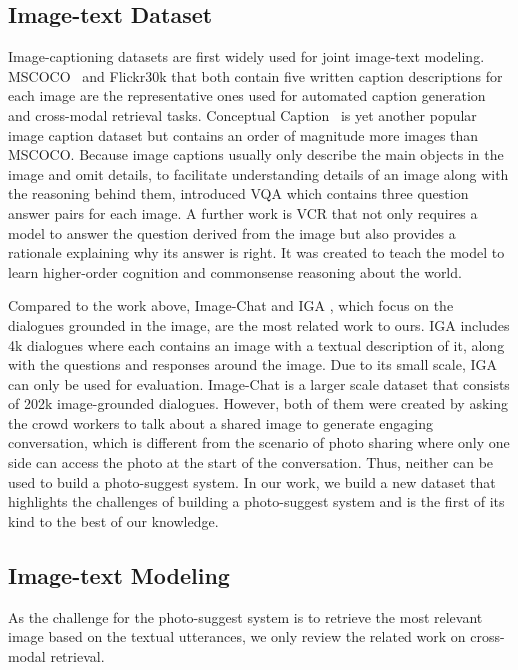 \documentclass[11pt,a4paper]{article}
\begin{document}
\subsection{Image-text Dataset}
Image-captioning datasets are first widely used for joint image-text modeling. 
MSCOCO~\cite{miscoco_lin_2014} and Flickr30k \cite{young-etal-2014-image} that both contain five written caption descriptions for each image are the representative ones used for automated caption generation and cross-modal retrieval tasks. Conceptual Caption~\cite{sharma2018conceptual} is yet another popular image caption dataset but contains an order of magnitude more images than MSCOCO. Because image captions usually only describe the main objects in the image and omit details, to facilitate understanding details of an image along with the reasoning behind them, \citet{vqa} introduced VQA which contains three question answer pairs for each image. A further work is VCR \citep{zellers2019vcr} that not only requires a model to answer the question derived from the image but also provides a rationale explaining why its answer is right. It was created to teach the model to learn higher-order cognition and commonsense reasoning about the world.

Compared to the work above, Image-Chat \cite{shuster-etal-2020-image} and IGA \cite{mostafazadeh2017imagegrounded}, which focus on the dialogues grounded in the image, are the most related work to ours. IGA includes 4k dialogues where each contains an image with a textual description of it, along with the questions and responses around the image. Due to its small scale, IGA can only be used for evaluation. Image-Chat is a larger scale dataset that consists of 202k image-grounded dialogues. However, both of them were created by asking the crowd workers to talk about a shared image to generate engaging conversation, which is different from the scenario of photo sharing where only one side can access the photo at the start of the conversation. Thus, neither can be used to build a photo-suggest system. In our work, we build a new dataset that highlights the challenges of building a photo-suggest system and is the first of its kind to the best of our knowledge.
\subsection{Image-text Modeling}
As the challenge for the photo-suggest system is to retrieve the most relevant image based on the textual utterances, we only review the related work on cross-modal retrieval.
\end{document}
